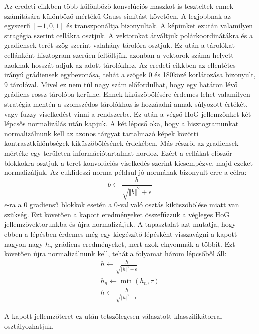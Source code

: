 Az eredeti cikkben több különböző konvolúciós maszkot is teszteltek ennek számítására különböző mértékű Gauss-simítást követően. A legjobbnak az egyszerű \([-1, 0, 1]\) és transzponáltja bizonyultak. A képünket ezután valamilyen stragégia szerint cellákra osztjuk. A vektorokat átváltjuk polárkoordinátákra és a gradiensek terét szög szerint valahány tárolóra osztjuk. Ez után a tárolókat cellánként hisztogram szerűen feltöltjük, azonban a vektorok száma helyett azoknak hosszát adjuk az adott tárolókhoz. Az eredeti cikkben az ellentétes irányú grádiensek egybevonása, tehát a szögek 0 és 180\textdegree közé korlátozása bizonyult, 9 tárolóval. Mivel ez nem túl nagy szám előfordulhat, hogy egy határon lévő grádiens rossz tárolóba kerülne. Ennek kiküszöbölésére érdemes lehet valamilyen stratégia mentén a szomszédos tárolókhoz is hozzáadni annak súlyozott értékét, vagy fuzzy viselkedést vinni a rendszerbe\cite{salhi_histograms_2013}. Ez után a végső HoG jellemzőnket két lépcsős normalizálás után kapjuk. A két lépcső oka, hogy a hisztogramunkat normalizálnunk kell az azonos tárgyat tartalmazó képek közötti kontrasztkülönbségek kiküszöbölésének érdekében. Más részről az gradiensek mértéke egy területen információtartalmat hordoz. Ezért a cellákat először blokkokra osztjuk a teret konvolúciós viselkedés szerint kicsempézve, majd ezeket normalizáljuk. Az euklideszi norma például jó normának bizonyult erre a célra:
\begin{equation}
    b \leftarrow \frac{b}{\sqrt{\Vert b \Vert^2 + \epsilon}}
\end{equation}
\(\epsilon\)-ra a 0 gradiensű blokkok esetén a 0-val való osztás kiküszöbölése miatt van szükség. Ezt követően a kapott eredményeket összefűzzük a végleges HoG jellemzővektorunkba és újra normalizáljuk. A tapasztalat azt mutatja, hogy ebben a lépésben érdemes még egy kiegészítő lépésként visszavágni a kapott nagyon nagy \(h_n\) grádiens eredményeket, mert azok elnyomnák a többit. Ezt követően újra normalizálnunk kell, tehát a folyamat három lépcsőből áll:
\begin{equation}
    \begin{split}
    h \leftarrow \frac{h}{\sqrt{\Vert h \Vert^2 + \epsilon}}\\
    h_{n} \leftarrow \min (h_{n}, \tau)\\
    h \leftarrow \frac{h}{\sqrt{\Vert h \Vert^2 + \epsilon}}
    \end{split}
\end{equation}

A kapott jellemzőteret ez után tetszőlegesen választott klasszifikátorral osztályozhatjuk.

